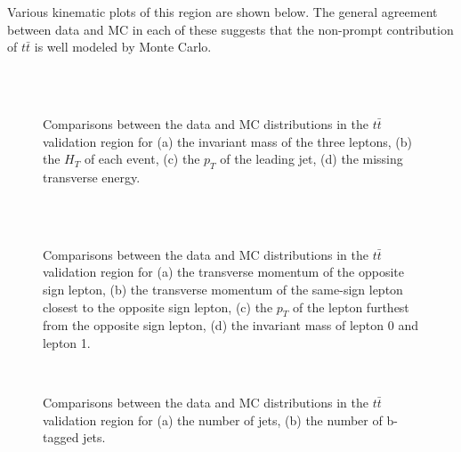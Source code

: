 Various kinematic plots of this region are shown below. The general agreement between data and MC in each of these suggests that the non-prompt contribution of $t\bar{t}$ is well modeled by Monte Carlo.

\begin{figure}[H]
    \\
    \\
    \caption{Comparisons between the data and MC distributions in the $t\bar{t}$ validation region for (a) the invariant mass of the three leptons, (b) the $H_T$ of each event, (c) the $p_T$ of the leading jet, (d) the missing transverse energy.}    
    \end{figure}
\begin{figure}[H]
    \\
    \\
    \caption{Comparisons between the data and MC distributions in the $t\bar{t}$ validation region for (a) the transverse momentum of the opposite sign lepton, (b) the transverse momentum of the same-sign lepton closest to the opposite sign lepton, (c) the $p_T$ of the lepton furthest from the opposite sign lepton, (d) the invariant mass of lepton 0 and lepton 1.}
\end{figure}
\begin{figure}[H]
    \\
    \caption{Comparisons between the data and MC distributions in the $t\bar{t}$ validation region for (a) the number of jets, (b) the number of b-tagged jets.}
    \label{ttbar_kinematics}
\end{figure}

